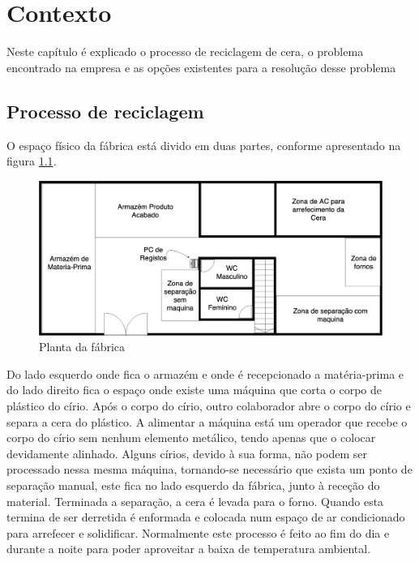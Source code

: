 \chapter{Contexto} 
\label{cap:2}
Neste capítulo é explicado o processo de reciclagem de cera, o problema encontrado na empresa e as opções existentes para a resolução desse problema
\section{Processo de reciclagem}
O espaço físico da fábrica está divido em duas partes, conforme apresentado na figura \ref{fig:planta_naturallife}.

\begin{figure}[H] 
	\begin{center}
		\includegraphics[width=\textwidth,keepaspectratio]{figuras/PlantaNaturalLife.png}
		\caption{Planta da fábrica}\label{fig:planta_naturallife} 
	\end{center}
\end{figure}

\noindent
Do lado esquerdo onde fica o armazém e onde é recepcionado a matéria-prima e do lado direito fica o espaço onde existe uma máquina que corta o corpo de plástico do círio. Após o corpo do círio, outro colaborador abre o corpo do círio e separa a cera do plástico. A alimentar a máquina está um operador que recebe o corpo do círio sem nenhum elemento metálico, tendo apenas que o colocar devidamente alinhado. Alguns círios, devido à sua forma, não podem ser processado nessa mesma máquina, tornando-se necessário que exista um ponto de separação manual, este fica no lado esquerdo da fábrica, junto à receção do material. Terminada a separação, a cera é levada para o forno. Quando esta termina de ser derretida é enformada e colocada num espaço de ar condicionado para arrefecer e solidificar. Normalmente este processo é feito ao fim do dia e durante a noite para poder aproveitar a baixa de temperatura ambiental.

